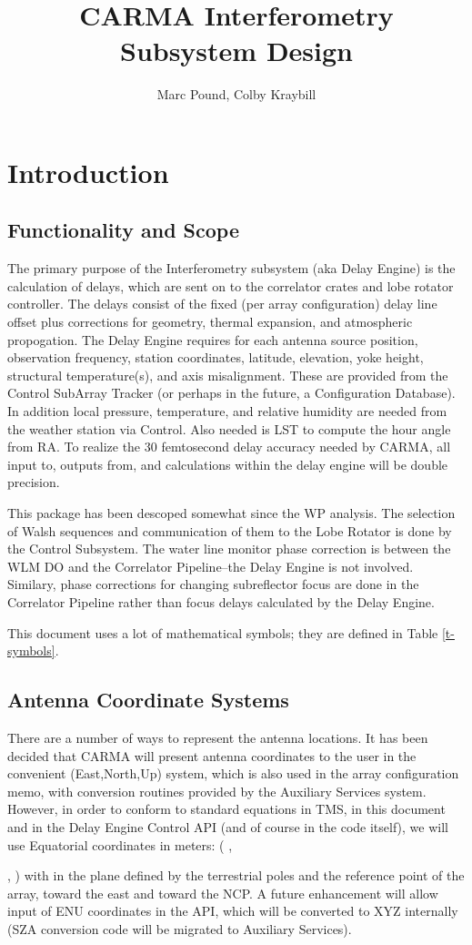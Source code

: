 \documentclass[preprint]{aastex}
\newcommand{\xlam}{
   \ifmmode{X_\lambda}
   \else{$X_\lambda$}
   \fi}
\newcommand{\ylam}{
   \ifmmode{Y_\lambda}
   \else{$Y_\lambda$}
   \fi}
\newcommand{\zlam}{
   \ifmmode{Z_\lambda}
   \else{$Z_\lambda$}
   \fi}
\begin{document}
\title{CARMA Interferometry Subsystem Design}
\author{Marc Pound, Colby Kraybill}


\section{Introduction}
\subsection{Functionality and Scope}

The primary purpose of the Interferometry subsystem (aka Delay  
Engine) is the calculation of delays, which are sent on to the correlator
crates and lobe rotator controller.  The delays consist of the fixed
(per array configuration) delay line offset plus corrections for geometry,
thermal expansion, and atmospheric propogation.  The Delay Engine
requires for each antenna source position, observation frequency, station
coordinates, latitude, elevation, yoke height, structural temperature(s),
and axis misalignment.  These are provided from the Control SubArray
Tracker (or perhaps in the future, a Configuration Database).  In addition local
pressure, temperature, and relative humidity are needed from the weather
station via Control.  Also needed is LST to compute the hour angle 
from RA.  To realize the 30 femtosecond delay accuracy needed by CARMA,
all input to, outputs from, and calculations within the delay 
engine will be double precision.

This package has been descoped somewhat since the WP analysis.
The selection of Walsh sequences and communication of them to the
Lobe Rotator is done by the Control Subsystem.  The water line monitor
phase correction is between the WLM DO and the Correlator Pipeline--the
Delay Engine is not involved. Similary, phase corrections for
changing subreflector focus are done in the Correlator Pipeline rather
than focus delays calculated by the Delay Engine.

This document uses a lot of mathematical symbols; they are defined
in Table \ref{t-symbols}.


\subsection{Antenna Coordinate Systems}
There are a number of ways to represent the antenna locations.  It has
been decided that CARMA will present antenna coordinates to the user in
the convenient (East,North,Up) system, which is also used in the array
configuration memo, with conversion routines provided by the Auxiliary
Services system.  However, in order to conform to standard equations in TMS,
in this document and in the Delay Engine Control API (and of course in the
code itself), 
we will use Equatorial coordinates in meters: (\xlam,
\ylam, \zlam) with \xlam in the plane defined by the terrestrial poles
and the reference point of the array, \ylam toward the east and \zlam
toward the NCP.  A future enhancement will allow input of ENU coordinates
in the API, which will be converted to XYZ internally 
(SZA conversion code will be migrated to Auxiliary Services).
\end{document}
